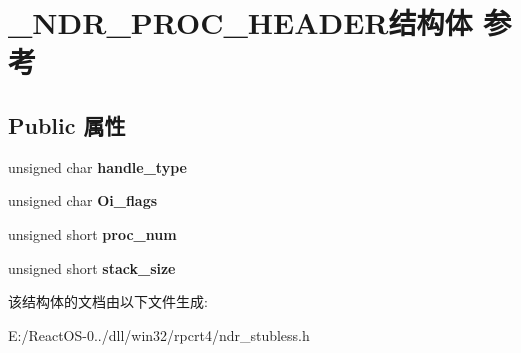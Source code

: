 \hypertarget{struct___n_d_r___p_r_o_c___h_e_a_d_e_r}{}\section{\+\_\+\+N\+D\+R\+\_\+\+P\+R\+O\+C\+\_\+\+H\+E\+A\+D\+E\+R结构体 参考}
\label{struct___n_d_r___p_r_o_c___h_e_a_d_e_r}
\subsection*{Public 属性}
\begin{DoxyCompactItemize}
\item 
\mbox{\label{struct___n_d_r___p_r_o_c___h_e_a_d_e_r_aa8e63d1a7bd809590c70236ea3e52dfe}} 
unsigned char {\bfseries handle\+\_\+type}
\item 
\mbox{\label{struct___n_d_r___p_r_o_c___h_e_a_d_e_r_a16f5c1946525aa4b51729149d3cef9a2}} 
unsigned char {\bfseries Oi\+\_\+flags}
\item 
\mbox{\label{struct___n_d_r___p_r_o_c___h_e_a_d_e_r_afe2964a6a6c42517f7e1ff6c152835a4}} 
unsigned short {\bfseries proc\+\_\+num}
\item 
\mbox{\label{struct___n_d_r___p_r_o_c___h_e_a_d_e_r_af69697735cd5ed7e83aedcf9f08c40bf}} 
unsigned short {\bfseries stack\+\_\+size}
\end{DoxyCompactItemize}


该结构体的文档由以下文件生成\+:\begin{DoxyCompactItemize}
\item 
E\+:/\+React\+O\+S-\/0../dll/win32/rpcrt4/ndr\+\_\+stubless.\+h\end{DoxyCompactItemize}
